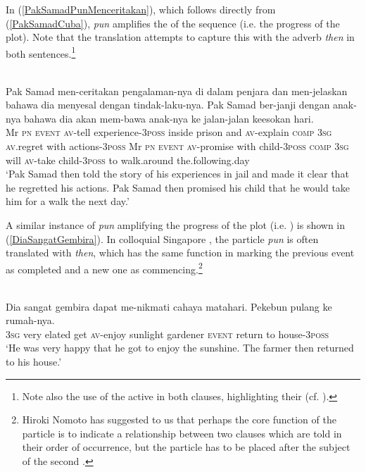 \documentclass[output=paper
,modfonts
,nonflat]{langsci/langscibook}
\begin{document}
\noindent
In (\ref{PakSamadPunMenceritakan}), which follows directly from (\ref{PakSamadCuba}), \emph{pun} amplifies the  of the sequence (i.e. the progress of the plot). Note that the translation attempts to capture this with the  adverb \emph{then} in both sentences.\footnote{Note also the use of the active  in both clauses, highlighting their  (cf. \citealt[this volume]{Djenar2018}).}

\ea\label{PakSamadPunMenceritakan} 
\\
\gll  {\ob}Pak Samad        men-ceritakan pengalaman-nya     {di dalam} penjara dan  men-jelaskan bahawa dia menyesal dengan tindak-laku-nya.  {\ob}Pak Samad         ber-janji dengan anak-nya      bahawa dia akan mem-bawa anak-nya      ke jalan-jalan {keesokan          hari}.\\
Mr  \textsc{pn} \textsc{event} \textsc{av-}tell         experience-\textsc{3poss} inside   prison  and  \textsc{av-}explain     \textsc{comp}   \textsc{3sg} \textsc{av.}regret   with   actions-\textsc{3poss} Mr  \textsc{pn} \textsc{event} \textsc{av-}promise  with     child-\textsc{3poss} \textsc{comp}   \textsc{3sg} will \textsc{av-}take    child-\textsc{3poss} to walk.around the.following.day\\
\glt `Pak Samad then told the story of his experiences in jail and made it clear that he regretted his actions. Pak Samad then promised his child that he would take him for a walk the next day.'
\z

\noindent
A similar instance of \emph{pun} amplifying the progress of the plot (i.e. ) is shown in (\ref{DiaSangatGembira}). In colloquial Singapore , the particle \emph{pun} is often translated with \emph{then}, which has the same function in marking the previous event as completed and a new one as commencing.\footnote{Hiroki Nomoto has suggested to us that perhaps the core function of the particle is to indicate a  relationship between two clauses which are told in their order of occurrence, but the particle has to be placed after the subject of the second  \citep[pun]{Nomoto2017}.}

\ea\label{DiaSangatGembira} 
\\
\gll Dia sangat gembira dapat me-nikmati {cahaya matahari}.  {\ob}Pekebun    pulang ke   rumah-nya.\\
\textsc{3sg} very elated         get   \textsc{av-}enjoy     sunlight gardener \textsc{event} return to   house-\textsc{3poss}\\
\glt `He was very happy that he got to enjoy the sunshine. The farmer then returned to his house.'
\z
\end{document}
